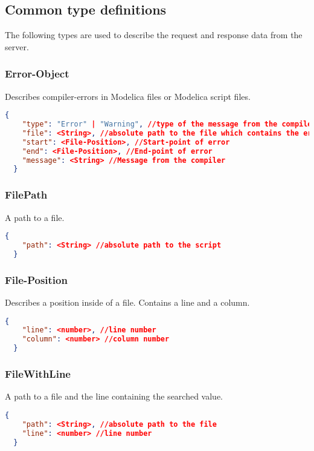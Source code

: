 \subsection{Common type definitions}
The following types are used to describe the request and response data
from the server.

  \subsubsection{Error-Object}
  Describes compiler-errors in Modelica files or Modelica script files.
  \newline{}
  \begin{lstlisting}[basicstyle=\small,language=json]
  {
    "type": "Error" | "Warning", //type of the message from the compiler
    "file": <String>, //absolute path to the file which contains the error
    "start": <File-Position>, //Start-point of error
    "end": <File-Position>, //End-point of error
    "message": <String> //Message from the compiler
  }
  \end{lstlisting}

  \subsubsection{FilePath}
  A path to a file.
  \newline{}
  \begin{lstlisting}[basicstyle=\small,language=json]
  {
    "path": <String> //absolute path to the script
  }
  \end{lstlisting}

  \subsubsection{File-Position}
  Describes a position inside of a file. Contains a
  line and a column.
  \newline{}
  \begin{lstlisting}[basicstyle=\small,language=json]
  {
    "line": <number>, //line number
    "column": <number> //column number
  }
  \end{lstlisting}

  \subsubsection{FileWithLine}
  A path to a file and the line containing the searched value.
  \newline{}
  \begin{lstlisting}[basicstyle=\small,language=json]
  {
    "path": <String>, //absolute path to the file
    "line": <number> //line number
  }
  \end{lstlisting}

